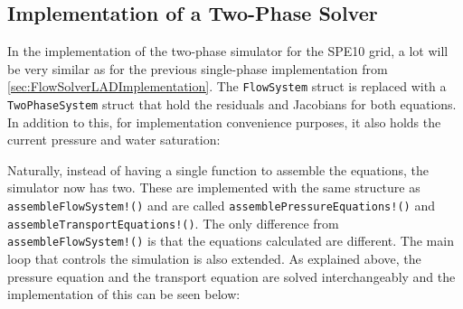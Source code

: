 \subsection{Implementation of a Two-Phase Solver}
In the implementation of the two-phase simulator for the SPE10 grid, a lot will be very similar as for the previous single-phase implementation from \autoref{sec:FlowSolverLADImplementation}. The \texttt{FlowSystem} struct is replaced with a \texttt{TwoPhaseSystem} struct that hold the residuals and Jacobians for both equations. In addition to this, for implementation convenience purposes, it also holds the current pressure and water saturation:

Naturally, instead of having a single function to assemble the equations, the simulator now has two. These are implemented with the same structure as \texttt{assembleFlowSystem!()} and are called \texttt{assemblePressureEquations!()} and \texttt{assembleTransportEquations!()}. The only difference from \texttt{assembleFlowSystem!()} is that the equations calculated are different. The main loop that controls the simulation is also extended. As explained above, the pressure equation and the transport equation are solved interchangeably and the implementation of this can be seen below:


